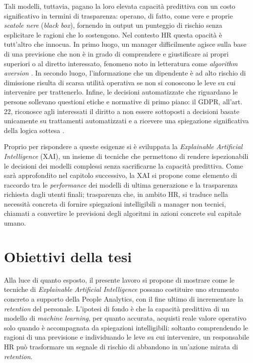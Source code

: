 Tali modelli, tuttavia, pagano la loro elevata capacità predittiva con un costo significativo in termini di trasparenza: operano, di fatto, come vere e proprie \textit{scatole nere} (\textit{black box}), fornendo in output un punteggio di rischio senza esplicitare le ragioni che lo sostengono. Nel contesto HR questa opacità è tutt'altro che innocua. In primo luogo, un manager difficilmente agisce sulla base di una previsione che non è in grado di comprendere e giustificare ai propri superiori o al diretto interessato, fenomeno noto in letteratura come \textit{algorithm aversion} \cite{dietvorst2015algorithm}.
In secondo luogo, l'informazione che un dipendente è ad alto rischio di dimissione risulta di scarsa utilità operativa se non si conoscono le leve su cui intervenire per trattenerlo. Infine, le decisioni automatizzate che riguardano le persone sollevano questioni etiche e normative di primo piano: il GDPR, all'art. 22, riconosce agli interessati il diritto a non essere sottoposti a decisioni basate unicamente su trattamenti automatizzati e a ricevere una spiegazione significativa della logica sottesa \cite{GDPR_Art22}.

Proprio per rispondere a queste esigenze si è sviluppata la \textit{Explainable Artificial Intelligence} (XAI), un insieme di tecniche che permettono di rendere ispezionabili le decisioni dei modelli complessi senza sacrificarne la capacità predittiva.
Come sarà approfondito nel capitolo successivo, la XAI si propone come elemento di raccordo tra le \textit{performance} dei modelli di ultima generazione e la trasparenza richiesta dagli utenti finali; trasparenza che, in ambito HR, si traduce nella necessità concreta di fornire spiegazioni intelligibili a manager non tecnici, chiamati a convertire le previsioni degli algoritmi in azioni concrete sul capitale umano.

\section{Obiettivi della tesi}

Alla luce di quanto esposto, il presente lavoro si propone di mostrare come le tecniche di \textit{Explainable Artificial Intelligence} possano costituire uno strumento concreto a supporto della People Analytics, con il fine ultimo di incrementare la \textit{retention} del personale. L'ipotesi di fondo è che la capacità predittiva di un modello di \textit{machine learning}, per quanto accurata, acquisti reale valore operativo solo quando è accompagnata da spiegazioni intelligibili: soltanto comprendendo le ragioni di una previsione e individuando le leve su cui intervenire, un responsabile HR può trasformare un segnale di rischio di abbandono in un'azione mirata di \textit{retention}.

